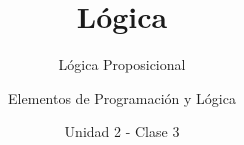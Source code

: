 \documentclass[usenames,dvipsnames]{../../common/beamerUNQaccessible}
\title{Lógica}
\subtitle{Lógica Proposicional}
\author{Elementos de Programación y Lógica}
\date{Unidad 2 - Clase 3}
\begin{document}
  \titleframe
  \toc
  
  \finaltitleframe
\end{document}
